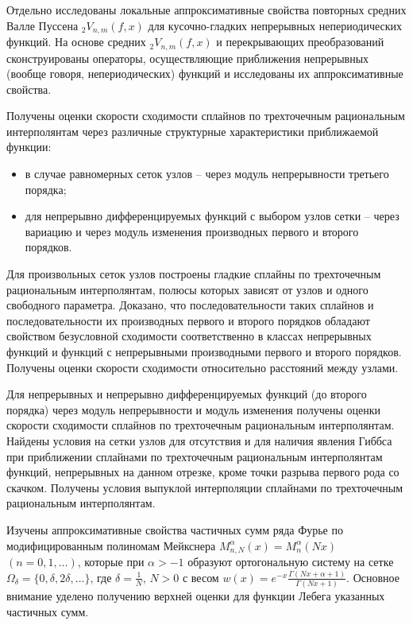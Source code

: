 Отдельно исследованы локальные аппроксимативные свойства повторных средних Валле Пуссена ${}_2 V_{n,m}(f,x)$ для кусочно-гладких непрерывных непериодических функций. На основе средних ${}_2 V_{n,m}(f,x)$ и перекрывающих преобразований сконструированы операторы, осуществляющие   приближения непрерывных (вообще говоря, непериодических) функций и исследованы их аппроксимативные свойства.






Получены оценки скорости сходимости сплайнов по трехточечным рациональным интерполянтам через различные структурные характеристики приближаемой функции:
\begin{itemize}
  \item
  в случае равномерных сеток узлов – через модуль непрерывности третьего порядка;
  \item
  для непрерывно дифференцируемых функций с выбором узлов сетки – через вариацию и через модуль изменения производных первого и второго порядков.
\end{itemize}

Для произвольных сеток узлов построены гладкие сплайны по трехточечным рациональным интерполянтам, полюсы которых зависят от узлов и одного свободного параметра. Доказано, что последовательности таких сплайнов и последовательности их производных первого и второго порядков обладают свойством безусловной сходимости соответственно в классах непрерывных функций и функций с непрерывными производными первого и второго порядков. Получены оценки скорости сходимости относительно расстояний между узлами.

Для непрерывных и непрерывно дифференцируемых функций (до второго порядка) через модуль непрерывности и модуль изменения получены оценки скорости сходимости сплайнов по трехточечным рациональным интерполянтам. Найдены условия на сетки узлов для отсутствия и для наличия явления Гиббса при приближении сплайнами по трехточечным рациональным интерполянтам функций, непрерывных на данном отрезке, кроме точки разрыва первого рода со скачком. Получены условия выпуклой интерполяции сплайнами по трехточечным рациональным интерполянтам.





Изучены аппроксимативные свойства частичных сумм ряда Фурье по модифицированным полиномам Мейкснера $M_{n,N}^\alpha(x)=M_n^\alpha(Nx)$ $(n=0, 1, \dots)$, которые при $\alpha>-1$ образуют ортогональную систему на сетке $\Omega_{\delta}=\{0, \delta, 2\delta, \ldots\}$, где $\delta=\frac{1}{N}$, $N>0$ с весом $w(x)=e^{-x}\frac{\Gamma(Nx+\alpha+1)}{\Gamma(Nx+1)}$. Основное внимание уделено получению верхней оценки для функции Лебега указанных частичных сумм.






